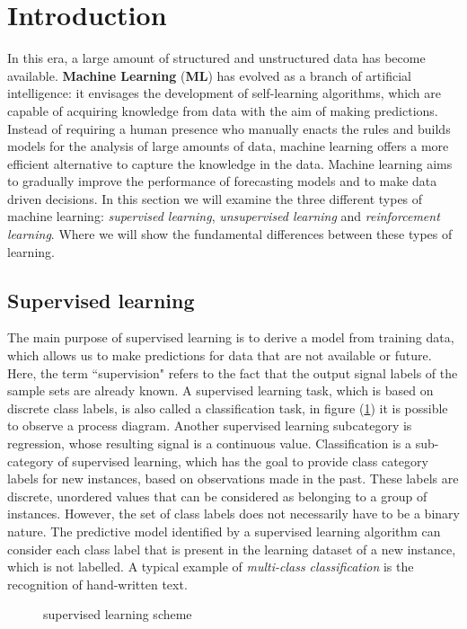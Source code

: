 \section{Introduction}
\label{sec:intro}
In this era, a large amount of structured and unstructured data has become 
available. \textbf{Machine Learning} (\textbf{ML}) has evolved as a branch of
artificial intelligence: it envisages the development of self-learning
algorithms, which are capable of acquiring knowledge from data with the aim of
making predictions. Instead of requiring a human presence who manually enacts
the rules and builds models for the analysis of large amounts of data, machine
learning offers a more efficient alternative to capture the knowledge in the
data. Machine learning aims to gradually improve the performance of forecasting
models and to make data driven decisions. In this section we will examine the
three different types of machine learning: \emph{supervised learning},
\emph{unsupervised learning} and \emph{reinforcement learning}. 
Where we will show the fundamental differences between these types of
learning.\cite{raschka2016machine}
%
\subsection{Supervised learning}
\label{subsec:supervised-learnig}
The main purpose of supervised learning is to derive a model from training data,
which allows us to make predictions for data that are not available or future.
Here, the term ``supervision" refers to the fact that the output signal labels
of the sample sets are already known. A supervised learning task, which is based
on discrete class labels, is also called a classification task, in figure
(\ref{fig:supervised-learning-scheme}) it is possible to observe a process
diagram. Another supervised learning subcategory is regression, whose resulting
signal is a continuous value. Classification is a sub-category of supervised
learning, which has the goal to provide class category labels for new instances,
based on observations made in the past.
These labels are discrete, unordered values that can be considered as belonging
to a group of instances. However, the set of class labels does not necessarily
have to be a binary nature. The predictive model identified by a supervised
learning algorithm can consider each class label that is present in the learning
dataset of a new instance, which is not labelled. 
A typical example of \emph{multi-class classification} is the recognition of
hand-written text.\cite{raschka2016machine}
%
\begin{figure}[!h]
\centering
\resizebox{0.65\textwidth}{!}{}
\caption{supervised learning scheme} 
\label{fig:supervised-learning-scheme}
\end{figure}
%
